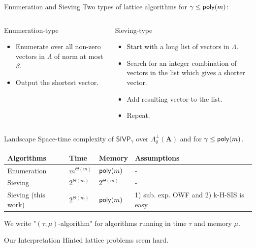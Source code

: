 \documentclass[xcolor=table,10pt,aspectratio=169]{beamer}
\renewcommand{\vec}[1]{\ensuremath{\mathbf{#1}}\xspace}
\providecommand{\mat}[1]{\ensuremath{\vec{#1}}\xspace}
\newcommand{\SIVP}{\ensuremath{\mathsf{SIVP}}\xspace}
\begin{document}
\begin{frame}[label={sec:org6f87155}]{Enumeration and Sieving}
Two types of lattice algorithms for \(\gamma \leq \poly[m]\):

\begin{columns}[t]
\begin{column}{0.45\columnwidth}
\begin{alertblock}{Enumeration-type}
\begin{itemize}
\item Enumerate over all non-zero vectors in \(\Lambda\) of norm at most \(\beta\).
\item Output the shortest vector.
\end{itemize}
\end{alertblock}
\end{column}

\begin{column}{0.45\columnwidth}
\begin{alertblock}{Sieving-type}
\begin{itemize}
\item Start with a long list of vectors in \(\Lambda\).
\item Search for an integer combination of vectors in the list which gives a shorter vector.
\item Add resulting vector to the list.
\item Repeat.
\end{itemize}
\end{alertblock}
\end{column}
\end{columns}
\end{frame}

\begin{frame}[label={sec:org487dfc5}]{Landscape}
Space-time complexity of \(\SIVP_\gamma\) over \(\Lambda_q^\bot(\mat{A})\) and for \(\gamma \leq \poly[m]\).

\begin{center}
\begin{tabular}{llll}
\toprule
Algorithms & Time & Memory & Assumptions\\[0pt]
\midrule
Enumeration & \(m^{\Theta(m)}\) & \(\poly[m]\) & -\\[0pt]
Sieving & \(2^{\Theta(m)}\) & \(2^{\Theta(m)}\) & -\\[0pt]
Sieving (this work) & \(2^{\Theta(m)}\) & \(\poly[m]\) & 1) sub. exp. OWF and 2) k-H-SIS is easy\\[0pt]
\bottomrule
\end{tabular}

\end{center}

We write "\((\tau,\mu)\)-algorithm" for algorithms running in time \(\tau\) and memory \(\mu\).

\begin{alertblock}{Our Interpretation}
Hinted lattice problems seem hard.
\end{alertblock}
\end{frame}
\end{document}
